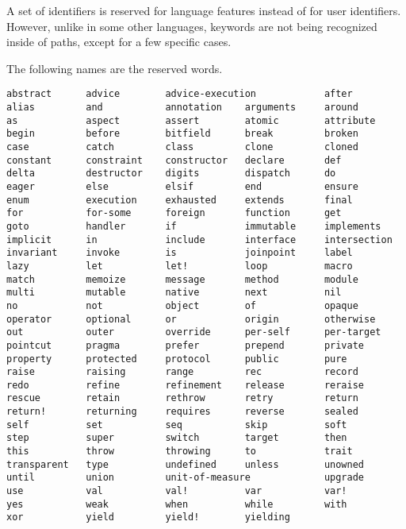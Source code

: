A set of identifiers is reserved for language features instead of for user identifiers. However, unlike in some other languages, keywords are not being recognized inside of paths, except for a few specific cases.

The following names are the reserved words.

\begin{lstlisting}
abstract      advice        advice-execution            after
alias         and           annotation    arguments     around
as            aspect        assert        atomic        attribute
begin         before        bitfield      break         broken
case          catch         class         clone         cloned
constant      constraint    constructor   declare       def
delta         destructor    digits        dispatch      do
eager         else          elsif         end           ensure
enum          execution     exhausted     extends       final
for           for-some      foreign       function      get
goto          handler       if            immutable     implements
implicit      in            include       interface     intersection
invariant     invoke        is            joinpoint     label
lazy          let           let!          loop          macro
match         memoize       message       method        module
multi         mutable       native        next          nil
no            not           object        of            opaque
operator      optional      or            origin        otherwise
out           outer         override      per-self      per-target
pointcut      pragma        prefer        prepend       private
property      protected     protocol      public        pure
raise         raising       range         rec           record
redo          refine        refinement    release       reraise
rescue        retain        rethrow       retry         return
return!       returning     requires      reverse       sealed
self          set           seq           skip          soft
step          super         switch        target        then
this          throw         throwing      to            trait
transparent   type          undefined     unless        unowned
until         union         unit-of-measure             upgrade
use           val           val!          var           var!
yes           weak          when          while         with
xor           yield         yield!        yielding
\end{lstlisting}

